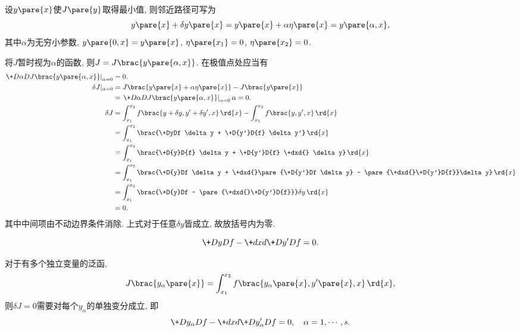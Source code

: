 \documentclass[../LectureNotes.tex]{subfiles}
\begin{document}
设$y\pare{x}$使$J\pare{y}$取得最小值, 则邻近路径可写为
\[ y\pare{x} + \delta y\pare{x} = y\pare{x} + \alpha \eta\pare{x} = y\pare{\alpha, x}, \]
其中$\alpha$为无穷小参数, $y\pare{0,x} = y\pare{x}$, $\eta\pare{x_1} = 0$, $\eta\pare{x_2} = 0$.
\par
将$J$暂时视为$\alpha$的函数, 则$J = J\brac{y\pare{\alpha,x}}$. 在极值点处应当有
\begin{align*}
    \left.\+D{\alpha}D{J\brac{y\pare{\alpha,x}}}\right\vert_{\alpha = 0} &= 0. \\
    \delta J\vert_{\alpha = 0} &= J\brac{y\pare{x} + \alpha \eta\pare{x}} - J\brac{y\pare{x}} \\
    &= \left.\+D{\alpha}D{J\brac{y\pare{\alpha,x}}}\right\vert_{\alpha = 0}\alpha = 0. \\
    \delta J &= \int_{x_1}^{x_2} f\brac{y+\delta y, y'+\delta y', x}\,\rd{x} - \int_{x_1}^{x_2} f\brac{y,y',x}\,\rd{x} \\
    &= \int_{x_1}^{x_2} \brac{\+DyDf \delta y + \+D{y'}D{f} \delta y'}\,\rd{x} \\
    &= \int_{x_1}^{x_2} \brac{\+D{y}D{f} \delta y + \+D{y'}D{f} \+dxd{} \delta y}\,\rd{x} \\
    &= \int_{x_1}^{x_2} \brac{\+D{y}Df \delta y + \+dxd{}\pare{\+D{y'}Df \delta y} - \pare{\+dxd{}\+D{y'}D{f}}\delta y}\,\rd{x} \\
    &= \int_{x_1}^{x_2} \brac{\+D{y}Df  - \pare{\+dxd{}\+D{y'}D{f}}}\delta y\,\rd{x} \\
    &= 0.
\end{align*}
其中中间项由不动边界条件消除. 上式对于任意$\delta y$皆成立, 故放括号内为零.
\begin{theorem}[Euler方程]
    \[ \+D{y}D{f} - \+dxd{}\+D{y'}D{f} = 0. \]
\end{theorem}
对于有多个独立变量的泛函,
\[ J\brac{y_\alpha\pare{x}} = \int_{x_1}^{x_2} f\brac{y_\alpha\pare{x},y'\pare{x},x}\,\rd{x}, \]
则$\delta J = 0$需要对每个$y_\alpha$的单独变分成立, 即
\[ \+D{y_\alpha}D{f} - \+dxd{}\+D{y'_\alpha}D{f} = 0,\quad \alpha = 1,\cdots, s. \]

\end{document}
